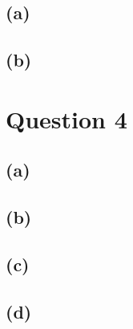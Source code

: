 \documentclass{article}
\begin{document}
\subsection*{(a)}

\subsection*{(b)}

\newpage
\section*{Question 4}
\subsection*{(a)}

\subsection*{(b)}

\newpage
\subsection*{(c)}

\subsection*{(d)}

\newpage
\end{document}
